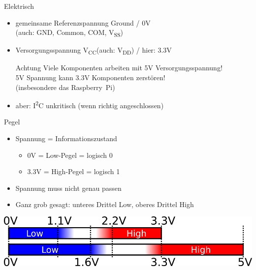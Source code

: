 \documentclass{beamer}
\newcommand{\ItC}{I\textsuperscript{2}C\xspace}
\newcommand{\RPi}{Raspberry~Pi\xspace}
\newcommand{\Vcc}{V\textsubscript{CC}\xspace}
\newcommand{\Vdd}{V\textsubscript{DD}\xspace}
\begin{document}
\begin{frame}{Elektrisch}
 \begin{itemize}
  \item gemeinsame Referenzspannung Ground / 0V\\(auch: GND, Common, COM, V\textsubscript{SS})
  \item Versorgungsspannung \Vcc (auch: \Vdd) / hier: 3.3V
    \begin{alertblock}{Achtung}
     Viele Komponenten arbeiten mit 5V Versorgungsspannung!\\
     5V Spannung kann 3.3V Komponenten zerstören!\\
     (insbesondere das \RPi )
    \end{alertblock}
  \item aber: \ItC unkritisch (wenn richtig angeschlossen)
 \end{itemize}
\end{frame}

\begin{frame}{Pegel}
 \begin{itemize}
   \item Spannung = Informationszustand
    \begin{itemize}
      \item 0V = Low-Pegel = logisch 0
      \item 3.3V = High-Pegel = logisch 1
    \end{itemize}
  \item Spannung muss nicht genau passen
  \item Ganz grob gesagt: unteres Drittel Low, oberes Drittel High
 \end{itemize}
 \includegraphics[width=\textwidth]{pegel.png}
\end{frame}
\end{document}

